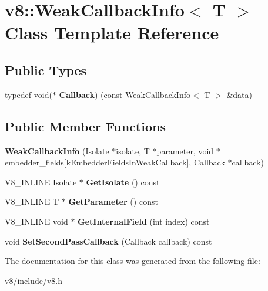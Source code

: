 \hypertarget{classv8_1_1WeakCallbackInfo}{}\section{v8\+:\+:Weak\+Callback\+Info$<$ T $>$ Class Template Reference}
\label{classv8_1_1WeakCallbackInfo}
\subsection*{Public Types}
\begin{DoxyCompactItemize}
\item 
\mbox{\label{classv8_1_1WeakCallbackInfo_a75f50fddcc9d5989e9cc04f8ab144d7d}} 
typedef void($\ast$ {\bfseries Callback}) (const \mbox{\hyperlink{classv8_1_1WeakCallbackInfo}{Weak\+Callback\+Info}}$<$ T $>$ \&data)
\end{DoxyCompactItemize}
\subsection*{Public Member Functions}
\begin{DoxyCompactItemize}
\item 
\mbox{\label{classv8_1_1WeakCallbackInfo_aabf19115b690b9baf1da8f440dfb3aa6}} 
{\bfseries Weak\+Callback\+Info} (Isolate $\ast$isolate, T $\ast$parameter, void $\ast$embedder\+\_\+fields\mbox{[}k\+Embedder\+Fields\+In\+Weak\+Callback\mbox{]}, Callback $\ast$callback)
\item 
\mbox{\label{classv8_1_1WeakCallbackInfo_a4cc354ee04d52d5ab880f1e9f85966c1}} 
V8\+\_\+\+I\+N\+L\+I\+NE Isolate $\ast$ {\bfseries Get\+Isolate} () const
\item 
\mbox{\label{classv8_1_1WeakCallbackInfo_a7fcf0d86f88eb066967de3c0e4a77ed4}} 
V8\+\_\+\+I\+N\+L\+I\+NE T $\ast$ {\bfseries Get\+Parameter} () const
\item 
\mbox{\label{classv8_1_1WeakCallbackInfo_a00732c95f8c130fba45ee6bbb3d3d819}} 
V8\+\_\+\+I\+N\+L\+I\+NE void $\ast$ {\bfseries Get\+Internal\+Field} (int index) const
\item 
\mbox{\label{classv8_1_1WeakCallbackInfo_af0f671ce037ff91319683e8f01645865}} 
void {\bfseries Set\+Second\+Pass\+Callback} (Callback callback) const
\end{DoxyCompactItemize}


The documentation for this class was generated from the following file\+:\begin{DoxyCompactItemize}
\item 
v8/include/v8.\+h\end{DoxyCompactItemize}
